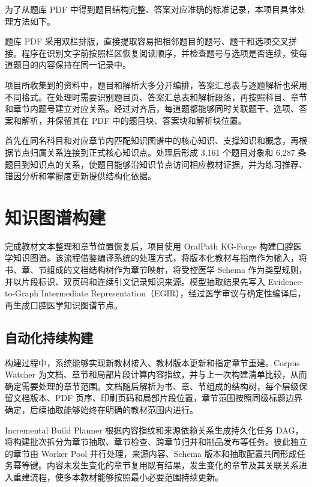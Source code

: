 为了从题库 PDF 中得到题目结构完整、答案对应准确的标准记录，本项目具体处理方法如下。

\nopagebreak[4]

题库 PDF 采用双栏排版，直接提取容易把相邻题目的题号、题干和选项交叉拼接。程序在识别文字前按照栏区恢复阅读顺序，并检查题号与选项是否连续，使每道题目的内容保持在同一记录中。


项目所收集到的资料中，题目和解析大多分开编排，答案汇总表与逐题解析也采用不同格式。在处理时需要识别题目页、答案汇总表和解析段落，再按照科目、章节和章节内题号建立对应关系。经过对齐后，每道题都能够同时关联题干、选项、答案和解析，并保留其在 PDF 中的题目块、答案块和解析块位置。



首先在同名科目和对应章节内匹配知识图谱中的核心知识、支撑知识和概念，再根据节点归属关系连接到正式核心知识点。处理后形成 3,161 个题目对象和 6,287 条题目到知识点的关系，使题目能够沿知识节点访问相应教材证据，并为练习推荐、错因分析和掌握度更新提供结构化依据。


\section{知识图谱构建}

完成教材文本整理和章节位置恢复后，项目使用 OralPath KG-Forge 构建口腔医学知识图谱。该流程借鉴编译系统的处理方式，将版本化教材与指南作为输入，将书、章、节组成的文档结构树作为章节映射，将受控医学 Schema 作为类型规则，并以片段标识、双页码和连续引文记录知识来源。模型抽取结果先写入 Evidence-to-Graph Intermediate Representation（EGIR），经过医学审议与确定性编译后，再生成口腔医学知识图谱节点。

\subsection{自动化持续构建}

构建过程中，系统能够实现新教材接入、教材版本更新和指定章节重建。Corpus Watcher 为文档、章节和局部片段计算内容指纹，并与上一次构建清单比较，从而确定需要处理的章节范围。文档随后解析为书、章、节组成的结构树，每个层级保留文档版本、PDF 页序、印刷页码和局部片段位置，章节范围按照同级标题边界确定，后续抽取能够始终在明确的教材范围内进行。

Incremental Build Planner 根据内容指纹和来源依赖关系生成持久化任务 DAG，将构建批次拆分为章节抽取、章节检查、跨章节归并和制品发布等任务。彼此独立的章节由 Worker Pool 并行处理，来源内容、Schema 版本和抽取配置共同形成任务幂等键。内容未发生变化的章节复用既有结果，发生变化的章节及其关联关系进入重建流程，使多本教材能够按照最小必要范围持续更新。

